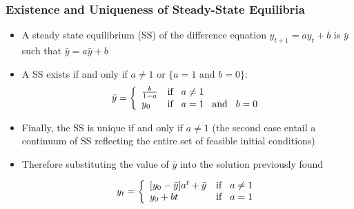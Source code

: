 \documentclass[11pt]{beamer}
\begin{document}
\begin{frame}
\frametitle{Existence and Uniqueness of Steady-State Equilibria}
\begin{itemize}\itemsep2ex
	\item A steady state equilibrium (SS) of the difference equation $y_{t+1} = a y_t + b$ is $\bar{y}$ such that $\bar{y} = a \bar{y} + b$
	\item A SS exists if and only if $a \neq 1$ or $\{a=1$ and $b=0\}$:
	\[\bar{y} =   \left\{
	\begin{array}{ll}
    \frac{b}{1-a} & \text{if} \hspace{0.3cm} a \neq 1 \\
   	y_0 & \text{if} \hspace{0.3cm}  a = 1 \hspace{0.3cm} \text{and} \hspace{0.3cm} b=0  \\
	\end{array}
	\right. \]
	\item Finally, the SS is unique if and only if $a \neq 1$ (the second case entail a continuum of SS reflecting the entire set of feasible initial conditions)
	\item Therefore substituting the value of $\bar{y}$ into the solution previously found

 	\[y_t =   \left\{
	\begin{array}{ll}
    [y_0-\bar{y}] a^t + \bar{y} & \text{if} \hspace{0.3cm} a \neq 1 \\
    y_0 + b t & \text{if} \hspace{0.3cm}  a = 1 \\
	\end{array}
	\right. \]
\end{itemize}
\end{frame}

\end{document}
